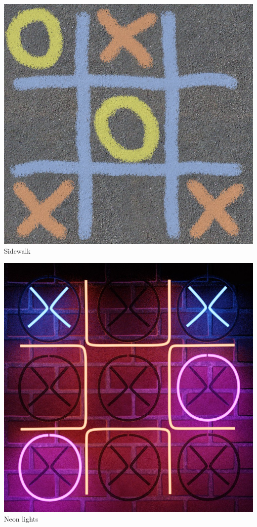 \documentclass{tufte-handout}
\begin{document}
\begin{marginfigure}
  \includegraphics[width=\linewidth]{img/concept-art/sidewalk}
  Sidewalk
\end{marginfigure}

\begin{marginfigure}
  \includegraphics[width=\linewidth]{img/concept-art/neon}
  Neon lights
\end{marginfigure}
\end{document}
